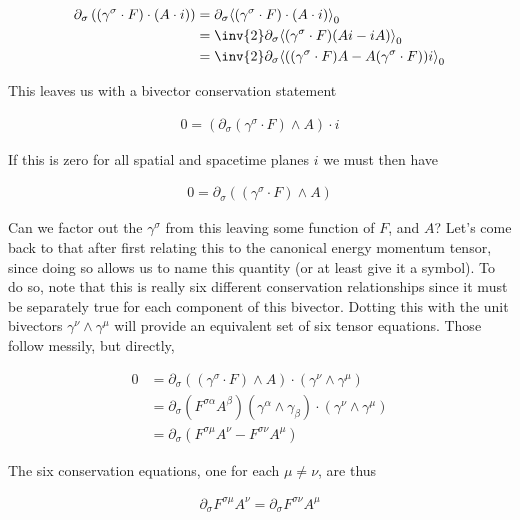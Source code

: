 \begin{align*}
\partial_\sigma \left( (\gamma^\sigma \cdot F) \cdot (A \cdot i) \right)
&=
\partial_\sigma \gpgradezero{ (\gamma^\sigma \cdot F) \cdot (A \cdot i) } \\
&=
\inv{2} \partial_\sigma \gpgradezero{ (\gamma^\sigma \cdot F) (A i - i A) } \\
&=
\inv{2} \partial_\sigma \gpgradezero{ ((\gamma^\sigma \cdot F) A -A (\gamma^\sigma \cdot F)) i } \\
\end{align*}

This leaves us with a bivector conservation statement

\begin{align}\label{eqn:rotationCurrents:goo10}
0 = \left( \partial_\sigma (\gamma^\sigma \cdot F) \wedge A \right) \cdot i
\end{align}

If this is zero for all spatial and spacetime planes $i$ we must then have

\begin{align}\label{eqn:rotationCurrents:goo11}
0 = \partial_\sigma \left( (\gamma^\sigma \cdot F) \wedge A \right)
\end{align}

Can we factor out the $\gamma^\sigma$ from this leaving some function of $F$, and $A$?  Let's come back to that after first relating this to the canonical energy momentum tensor, since doing so allows us to name this quantity (or at least give it a symbol).  To do so, note that this is really six different conservation relationships since it must be separately true for each component of this bivector.   Dotting this with the unit bivectors $\gamma^\nu \wedge \gamma^\mu$ will provide an equivalent set of six tensor equations.  Those follow messily, but directly,

\begin{align*}
0
&=
\partial_\sigma \left( (\gamma^\sigma \cdot F) \wedge A \right)  \cdot (\gamma^\nu \wedge \gamma^\mu) \\
&=
\partial_\sigma (F^{\sigma\alpha} A^\beta) (\gamma^\alpha \wedge \gamma_\beta) \cdot (\gamma^\nu \wedge \gamma^\mu) \\
&=
\partial_\sigma (F^{\sigma\mu} A^\nu -F^{\sigma\nu} A^\mu )
\end{align*}

The six conservation equations, one for each $\mu \ne \nu$, are thus

\begin{align}\label{eqn:rotationCurrents:goo12}
\partial_\sigma F^{\sigma\mu} A^\nu = \partial_\sigma F^{\sigma\nu} A^\mu
\end{align}

